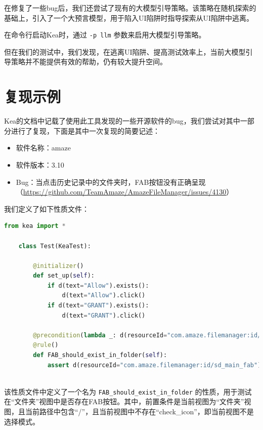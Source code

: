 \documentclass{article}
\begin{document}
在修复了一些bug后，我们还尝试了现有的大模型引导策略。该策略在随机探索的基础上，引入了一个大预言模型，用于陷入UI陷阱时指导探索从UI陷阱中逃离。

在命令行启动Kea时，通过 \texttt{-p llm} 参数来启用大模型引导策略。

但在我们的测试中，我们发现，在逃离UI陷阱、提高测试效率上，当前大模型引导策略并不能提供有效的帮助，仍有较大提升空间。

\section{复现示例}

Kea的文档中记载了使用此工具发现的一些开源软件的bug，我们尝试对其中一部分进行了复现，下面是其中一次复现的简要记述：

\begin{itemize}[noitemsep]
    \item 软件名称：amaze
    \item 软件版本：3.10
    \item Bug：当点击历史记录中的文件夹时，FAB按钮没有正确呈现（\url{https://github.com/TeamAmaze/AmazeFileManager/issues/4130}）
\end{itemize}

我们定义了如下性质文件：

\begin{lstlisting}[language=python]
    from kea import *

    class Test(KeaTest):
    
        @initializer()
        def set_up(self):
            if d(text="Allow").exists():
                d(text="Allow").click()
            if d(text="GRANT").exists():
                d(text="GRANT").click()
    
        @precondition(lambda _: d(resourceId="com.amaze.filemanager:id/fullpath").exists() and '/' in d(resourceId="com.amaze.filemanager:id/fullpath").info['text'] and not d(resourceId="com.amaze.filemanager:id/check_icon").exists())
        @rule()
        def FAB_should_exist_in_folder(self):
            assert d(resourceId="com.amaze.filemanager:id/sd_main_fab").exists()
            
\end{lstlisting}

该性质文件中定义了一个名为 \texttt{FAB\_should\_exist\_in\_folder} 的性质，用于测试在``文件夹''视图中是否存在FAB按钮。其中，前置条件是当前视图为``文件夹''视图，且当前路径中包含``/''，且当前视图中不存在``check\_icon''，即当前视图不是选择模式。
\end{document}
